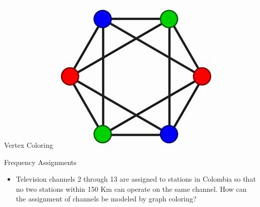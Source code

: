 \documentclass{beamer}
\theoremstyle{definition}
\begin{document}
\begin{frame}{Vertex Coloring}
    \centering \includegraphics[width=.6\linewidth]{p4.jpg}
\end{frame}

\begin{frame}{Frequency Assignments}
    \begin{itemize}
     \item Television channels 2 through 13 are assigned to stations in Colombia so that no two stations within 150 Km can operate on the same channel. How can the assignment of channels be modeled by graph coloring?
    \end{itemize}
\end{frame}
\end{document}
